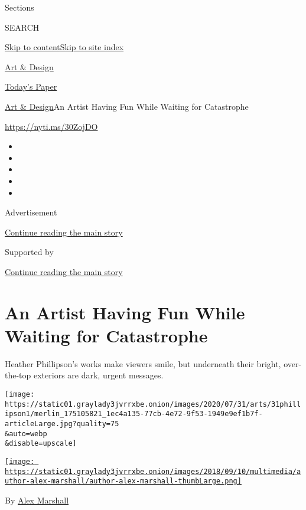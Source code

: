 Sections

SEARCH

\protect\hyperlink{site-content}{Skip to
content}\protect\hyperlink{site-index}{Skip to site index}

\href{https://www.nytimes3xbfgragh.onion/section/arts/design}{Art \&
Design}

\href{https://myaccount.nytimes3xbfgragh.onion/auth/login?response_type=cookie\&client_id=vi}{}

\href{https://www.nytimes3xbfgragh.onion/section/todayspaper}{Today's
Paper}

\href{/section/arts/design}{Art \& Design}\textbar{}An Artist Having Fun
While Waiting for Catastrophe

\url{https://nyti.ms/30ZojDO}

\begin{itemize}
\item
\item
\item
\item
\item
\end{itemize}

Advertisement

\protect\hyperlink{after-top}{Continue reading the main story}

Supported by

\protect\hyperlink{after-sponsor}{Continue reading the main story}

\hypertarget{an-artist-having-fun-while-waiting-for-catastrophe}{%
\section{An Artist Having Fun While Waiting for
Catastrophe}\label{an-artist-having-fun-while-waiting-for-catastrophe}}

Heather Phillipson's works make viewers smile, but underneath their
bright, over-the-top exteriors are dark, urgent messages.

\texttt{[image: https://static01.graylady3jvrrxbe.onion/images/2020/07/31/arts/31phillipson1/merlin\_175105821\_1ec4a135-77cb-4e72-9f53-1949e9ef1b7f-articleLarge.jpg?quality=75\\\&auto=webp\\\&disable=upscale]}

\href{https://www.nytimes3xbfgragh.onion/by/alex-marshall}{\texttt{[image: https://static01.graylady3jvrrxbe.onion/images/2018/09/10/multimedia/author-alex-marshall/author-alex-marshall-thumbLarge.png]}}

By \href{https://www.nytimes3xbfgragh.onion/by/alex-marshall}{Alex
Marshall}

